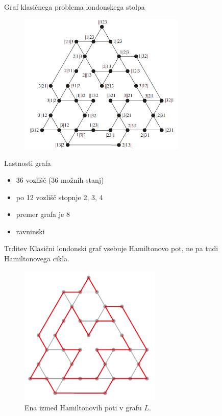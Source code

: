 \documentclass[dvipsnames]{beamer}
\begin{document}
\begin{frame}{Graf klasičnega problema londonskega stolpa}
    
    \begin{figure}
        \centering
        \includegraphics[height=190pt]{../img/tolgraph.png}
    \end{figure}
\end{frame}


\begin{frame}{Lastnosti grafa}
    \begin{itemize}
        \item 36 vozlišč (36 možnih stanj)
        \item po 12 vozlišč stopnje 2, 3, 4
        \item premer grafa je 8
        \item ravninski
    \end{itemize}
   	\begin{block}{Trditev}
   		Klasični londonski graf vsebuje Hamiltonovo pot, ne pa tudi Hamiltonovega cikla.
   	\end{block}
\end{frame}

\begin{frame}
    \begin{figure}
        \centering
        \includegraphics[height=190pt]{../img/tolgraph-ham-path.png}
        \caption{Ena izmed Hamiltonovih poti v grafu $L$.}
    \end{figure}
\end{frame}
\end{document}
